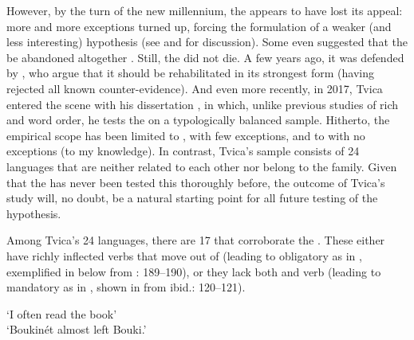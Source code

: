 \documentclass[output=paper,colorlinks,citecolor=brown,draft,draftmode]{langscibook}
\begin{document}
However, by the turn of the new millennium, the  appears to have lost its appeal: more and more exceptions turned up, forcing the formulation of a weaker (and less interesting) hypothesis (see \citealt{BobaljikThrainsson1998} and \citealt{Sundquist2003} for discussion). Some even suggested that the  be abandoned altogether \citep{WiklundEtAl2007}. Still, the  did not die. A few years ago, it was defended by \citet{KoenemanZeijlstra2014}, who argue that it should be rehabilitated in its strongest form (having rejected all known counter-evidence). And even more recently, in 2017, Tvica entered the scene with his dissertation \citep{Tvica2017}, in which, unlike previous studies of rich  and word order, he tests the  on a typologically balanced sample. Hitherto, the empirical scope has been limited to , with few exceptions, and to  with no exceptions (to my knowledge). In contrast, Tvica’s sample consists of 24 languages that are neither related to each other nor belong to the  family. Given that the  has never been tested this thoroughly before, the outcome of Tvica’s study will, no doubt, be a natural starting point for all future testing of the hypothesis. 



Among Tvica’s 24 languages, there are 17 that corroborate the . These either have richly inflected verbs that move out of  (leading to obligatory  as in , exemplified in  below from \citealt{Tvica2017}: 189–190), or they lack both  and verb  (leading to mandatory  as in , shown in  from ibid.: 120–121).


\ea\label{ex:petzell:25}
\glt `I often read the book’  \\
\glt `Boukinét almost left Bouki.’
\z
\z
\end{document}
